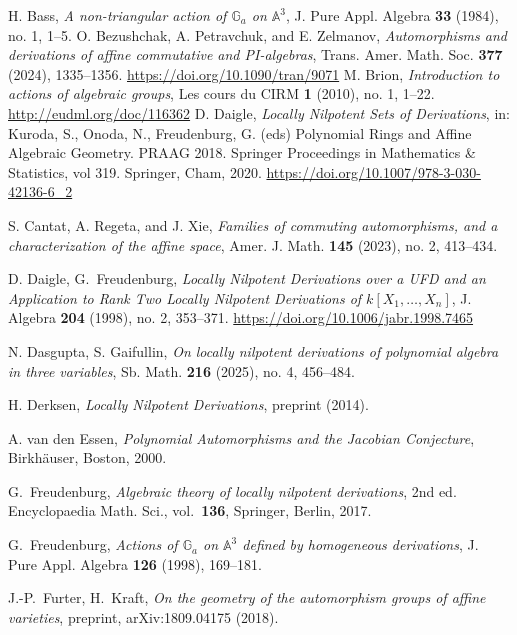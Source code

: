 \documentclass[12pt,a4paper]{amsart}
\theoremstyle{plain}
\theoremstyle{definition}
\theoremstyle{remark}
\def\AA{{\mathbb A}}
\def\G{{\mathbb G}}
\begin{document}
\begin{thebibliography}{}
    H. Bass, \emph{A non-triangular action of $\G_a$ on $\AA^3$}, J. Pure Appl. Algebra \textbf{33} (1984), no. 1, 1--5.
    O. Bezushchak, A. Petravchuk, and E. Zelmanov, \emph{Automorphisms and derivations of affine commutative and PI-algebras}, Trans. Amer. Math. Soc. \textbf{377} (2024), 1335--1356. \url{https://doi.org/10.1090/tran/9071}
    M. Brion, \emph{Introduction to actions of algebraic groups}, Les cours du CIRM \textbf{1} (2010), no. 1, 1--22. \url{http://eudml.org/doc/116362}
    D. Daigle, \emph{Locally Nilpotent Sets of Derivations}, in: Kuroda, S., Onoda, N., Freudenburg, G. (eds) Polynomial Rings and Affine Algebraic Geometry. 
   PRAAG 2018. Springer Proceedings in Mathematics \& Statistics, vol 319. Springer, Cham, 2020. \url{https://doi.org/10.1007/978-3-030-42136-6_2}
   
    S. Cantat, A. Regeta, and J. Xie, \emph{Families of commuting automorphisms, and a characterization of the affine space}, Amer. J. Math. \textbf{145} (2023), no. 2, 413--434.
   
    D. Daigle, G.~Freudenburg, \emph{Locally Nilpotent Derivations over a UFD and an Application to Rank Two Locally Nilpotent Derivations of $k[X_1,\ldots,X_n]$}, J. Algebra \textbf{204} (1998), no. 2, 353--371. \url{https://doi.org/10.1006/jabr.1998.7465}
   
    N. Dasgupta, S. Gaifullin, \emph{On locally nilpotent derivations of polynomial algebra in three variables}, Sb. Math. \textbf{216} (2025), no. 4, 456--484.
   
    H. Derksen, \emph{Locally Nilpotent Derivations}, preprint (2014).
   
    A. van den Essen, \emph{Polynomial Automorphisms and the Jacobian Conjecture}, Birkh\"auser, Boston, 2000.
   
   
    G.~Freudenburg, \emph{Algebraic theory
   of locally nilpotent derivations}, 2nd ed.
   Encyclopaedia Math. Sci., vol.\ \textbf{136}, Springer, Berlin, 2017.
   
    G.~Freudenburg, \emph{Actions of $\G_a$ on $\AA^3$ defined by homogeneous derivations}, J. Pure Appl. Algebra \textbf{126} (1998), 169--181.
   
    J.-P.~Furter, H.~Kraft, \emph{On the geometry of the automorphism groups of affine varieties}, preprint, arXiv:1809.04175 (2018). 
   

\end{thebibliography}
\end{document}
